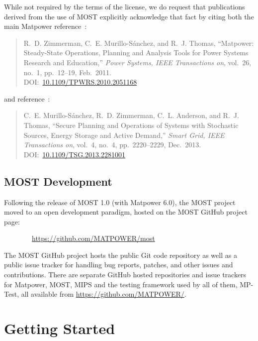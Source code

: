 \documentclass[12pt]{article}
\newcommand{\matpower}[0]{{\sc Matpower}}
\newcommand{\mptest}[0]{{MP-Test}}
\newcommand{\mips}[0]{{MIPS}}
\newcommand{\most}[0]{{MOST}}
\newcommand{\mosturl}[0]{https://github.com/MATPOWER/most}
\numberwithin{equation}{section}
\numberwithin{table}{section}
\numberwithin{figure}{section}
\begin{document}
While not required by the terms of the license, we do request that publications derived from the use of \most{} explicitly acknowledge that fact by citing both the main \matpower{} reference~\cite{zimmerman2011}:

\begin{quote}
\footnotesize
R.~D. Zimmerman, C.~E. Murillo-S{\'a}nchez, and R.~J. Thomas, ``\matpower{}: Steady-State Operations, Planning and Analysis Tools for Power Systems Research and Education,'' \emph{Power Systems, IEEE Transactions on}, vol.~26, no.~1, pp.~12--19, Feb.~2011.\\
DOI:~\href{https://doi.org/10.1109/TPWRS.2010.2051168}{10.1109/TPWRS.2010.2051168}
\end{quote}

and reference~\cite{murillo-sanchez2013a}:

\begin{quote}
\footnotesize
C.~E. Murillo-S{\'a}nchez, R.~D. Zimmerman, C.~L. Anderson, and R.~J. Thomas, ``Secure Planning and Operations of Systems with Stochastic Sources, Energy Storage and Active Demand,'' \emph{Smart Grid, IEEE Transactions on}, vol.~4, no.~4, pp.~2220--2229, Dec.~2013.\\
DOI:~\href{https://doi.org/10.1109/TSG.2013.2281001}{10.1109/TSG.2013.2281001}
\end{quote}

\subsection{\most{} Development}
\label{sec:development}

Following the release of \most{} 1.0 (with \matpower{} 6.0), the \most{} project moved to an open development paradigm, hosted on the \most{} GitHub project page:

\bigskip

~~~~~~~~\url{\mosturl}

\bigskip

The \most{} GitHub project hosts the public Git code repository as well as a public issue tracker for handling bug reports, patches, and other issues and contributions. There are separate GitHub hosted repositories and issue trackers for \matpower{}, \most{}, \mips{} and the testing framework used by all of them, \mptest{}, all available from \url{https://github.com/MATPOWER/}.


\clearpage
\section{Getting Started}
\end{document}
